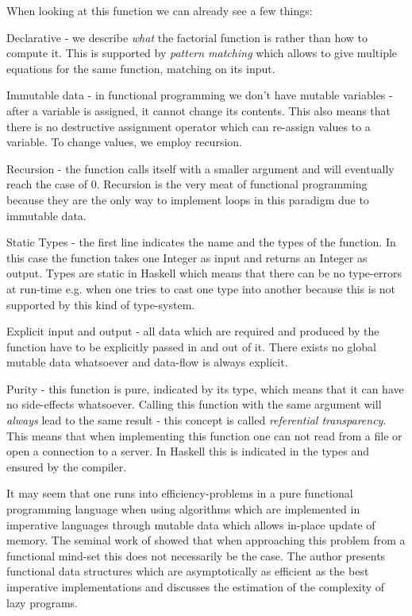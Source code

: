 When looking at this function we can already see a few things: 
\begin{enumerate*}
	\item Declarative - we describe \textit{what} the factorial function is rather than how to compute it. This is supported by \textit{pattern matching} which allows to give multiple equations for the same function, matching on its input. 
	\item Immutable data - in functional programming we don't have mutable variables - after a variable is assigned, it cannot change its contents. This also means that there is no destructive assignment operator which can re-assign values to a variable. To change values, we employ recursion.
	\item Recursion - the function calls itself with a smaller argument and will eventually reach the case of 0. Recursion is the very meat of functional programming because they are the only way to implement loops in this paradigm due to immutable data.
	\item Static Types - the first line indicates the name and the types of the function. In this case the function takes one Integer as input and returns an Integer as output. Types are static in Haskell which means that there can be no type-errors at run-time e.g. when one tries to cast one type into another because this is not supported by this kind of type-system.
	\item Explicit input and output - all data which are required and produced by the function have to be explicitly passed in and out of it. There exists no global mutable data whatsoever and data-flow is always explicit.
	\item Purity - this function is pure, indicated by its type, which means that it can have no side-effects whatsoever. Calling this function with the same argument will \textit{always} lead to the same result - this concept is called \textit{referential transparency}. This means that when implementing this function one can not read from a file or open a connection to a server. In Haskell this is indicated in the types and ensured by the compiler.
\end{enumerate*}

It may seem that one runs into efficiency-problems in a pure functional programming language when using algorithms which are implemented in imperative languages through mutable data which allows in-place update of memory. The seminal work of \citep{okasaki_purely_1999} showed that when approaching this problem from a functional mind-set this does not necessarily be the case. The author presents functional data structures which are asymptotically as efficient as the best imperative implementations and discusses the estimation of the complexity of lazy programs.

